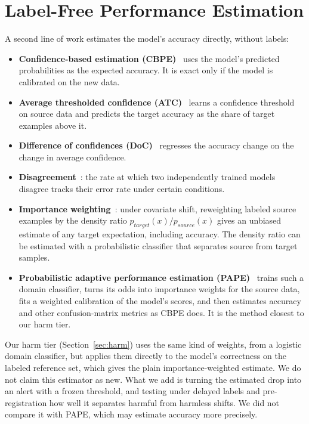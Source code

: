 \section{Label-Free Performance Estimation}
A second line of work estimates the model's accuracy directly, without labels:
\begin{itemize}
\item \textbf{Confidence-based estimation (CBPE)}~\cite{nannyml_cbpe} uses the model's predicted probabilities as the expected accuracy. It is exact only if the model is calibrated on the new data.
\item \textbf{Average thresholded confidence (ATC)}~\cite{garg2022atc} learns a confidence threshold on source data and predicts the target accuracy as the share of target examples above it.
\item \textbf{Difference of confidences (DoC)}~\cite{guillory2021doc} regresses the accuracy change on the change in average confidence.
\item \textbf{Disagreement}~\cite{jiang2022disagreement}: the rate at which two independently trained models disagree tracks their error rate under certain conditions.
\item \textbf{Importance weighting}~\cite{shimodaira2000,sugiyama2007iwcv}: under covariate shift, reweighting labeled source examples by the density ratio $p_{target}(x)/p_{source}(x)$ gives an unbiased estimate of any target expectation, including accuracy. The density ratio can be estimated with a probabilistic classifier that separates source from target samples.
\item \textbf{Probabilistic adaptive performance estimation (PAPE)}~\cite{bialek2025pape} trains such a domain classifier, turns its odds into importance weights for the source data, fits a weighted calibration of the model's scores, and then estimates accuracy and other confusion-matrix metrics as CBPE does. It is the method closest to our harm tier.
\end{itemize}
Our harm tier (Section~\ref{sec:harm}) uses the same kind of weights, from a logistic domain classifier, but applies them directly to the model's correctness on the labeled reference set, which gives the plain importance-weighted estimate. We do not claim this estimator as new. What we add is turning the estimated drop into an alert with a frozen threshold, and testing under delayed labels and pre-registration how well it separates harmful from harmless shifts. We did not compare it with PAPE, which may estimate accuracy more precisely.

